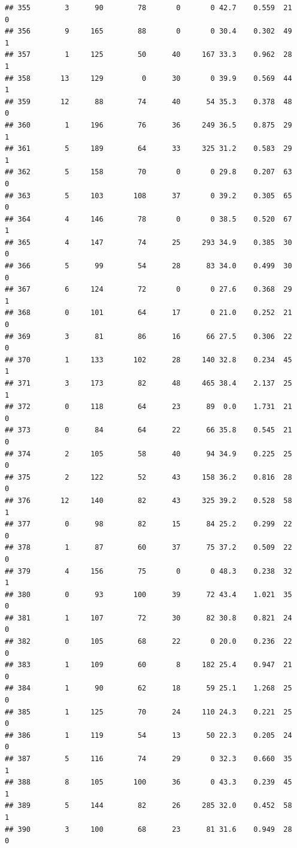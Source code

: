 \documentclass[11pt, a4paper]{article}\usepackage[]{graphicx}\usepackage[]{xcolor}
\makeatletter
\newenvironment{kframe}{%
 \def\at@end@of@kframe{}%
 \ifinner\ifhmode%
  \def\at@end@of@kframe{\end{minipage}}%
  \begin{minipage}{\columnwidth}%
 \fi\fi%
 \def\FrameCommand##1{\hskip\@totalleftmargin \hskip-\fboxsep
 \colorbox{shadecolor}{##1}\hskip-\fboxsep
     \hskip-\linewidth \hskip-\@totalleftmargin \hskip\columnwidth}%
 \MakeFramed {\advance\hsize-\width
   \@totalleftmargin\z@ \linewidth\hsize
   \@setminipage}}%
 {\par\unskip\endMakeFramed%
 \at@end@of@kframe}
\newenvironment{knitrout}{}{} %
\makeatother
\begin{document}
\begin{knitrout}
\begin{kframe}
\begin{verbatim}
## 355        3      90        78       0       0 42.7    0.559  21    0
## 356        9     165        88       0       0 30.4    0.302  49    1
## 357        1     125        50      40     167 33.3    0.962  28    1
## 358       13     129         0      30       0 39.9    0.569  44    1
## 359       12      88        74      40      54 35.3    0.378  48    0
## 360        1     196        76      36     249 36.5    0.875  29    1
## 361        5     189        64      33     325 31.2    0.583  29    1
## 362        5     158        70       0       0 29.8    0.207  63    0
## 363        5     103       108      37       0 39.2    0.305  65    0
## 364        4     146        78       0       0 38.5    0.520  67    1
## 365        4     147        74      25     293 34.9    0.385  30    0
## 366        5      99        54      28      83 34.0    0.499  30    0
## 367        6     124        72       0       0 27.6    0.368  29    1
## 368        0     101        64      17       0 21.0    0.252  21    0
## 369        3      81        86      16      66 27.5    0.306  22    0
## 370        1     133       102      28     140 32.8    0.234  45    1
## 371        3     173        82      48     465 38.4    2.137  25    1
## 372        0     118        64      23      89  0.0    1.731  21    0
## 373        0      84        64      22      66 35.8    0.545  21    0
## 374        2     105        58      40      94 34.9    0.225  25    0
## 375        2     122        52      43     158 36.2    0.816  28    0
## 376       12     140        82      43     325 39.2    0.528  58    1
## 377        0      98        82      15      84 25.2    0.299  22    0
## 378        1      87        60      37      75 37.2    0.509  22    0
## 379        4     156        75       0       0 48.3    0.238  32    1
## 380        0      93       100      39      72 43.4    1.021  35    0
## 381        1     107        72      30      82 30.8    0.821  24    0
## 382        0     105        68      22       0 20.0    0.236  22    0
## 383        1     109        60       8     182 25.4    0.947  21    0
## 384        1      90        62      18      59 25.1    1.268  25    0
## 385        1     125        70      24     110 24.3    0.221  25    0
## 386        1     119        54      13      50 22.3    0.205  24    0
## 387        5     116        74      29       0 32.3    0.660  35    1
## 388        8     105       100      36       0 43.3    0.239  45    1
## 389        5     144        82      26     285 32.0    0.452  58    1
## 390        3     100        68      23      81 31.6    0.949  28    0

\end{verbatim}
\end{kframe}
\end{knitrout}
\end{document}
